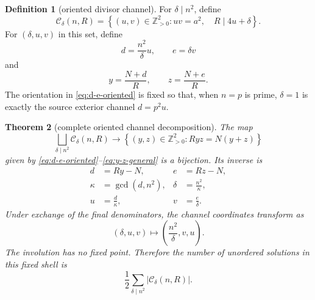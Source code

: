 \documentclass[11pt]{article}
\newtheorem{theorem}{Theorem}[section]
\theoremstyle{definition}
\newtheorem{definition}[theorem]{Definition}
\theoremstyle{remark}
\newcommand{\Z}{\mathbb Z}
\newcommand{\1}{\mathbf 1}
\begin{document}
\begin{definition}[oriented divisor channel]\label{def:channel}
For $\delta\mid n^2$, define
\begin{equation}\label{eq:channel-set}
 \mathscr C_\delta(n,R)=
 \left\{(u,v)\in\Z_{>0}^2:
 uv=a^2,\quad R\mid4u+\delta\right\}.
\end{equation}
For $(\delta,u,v)$ in this set, define
\begin{equation}\label{eq:d-e-oriented}
 d=\frac{n^2}{\delta}u,\qquad e=\delta v
\end{equation}
and
\begin{equation}\label{eq:y-z-general}
 y=\frac{N+d}{R},\qquad z=\frac{N+e}{R}.
\end{equation}
The orientation in \eqref{eq:d-e-oriented} is fixed so that, when $n=p$ is
prime, $\delta=1$ is exactly the source exterior channel
$d=p^2u$.
\end{definition}

\begin{theorem}[complete oriented channel decomposition]\label{thm:complete-channel}
The map
\begin{equation}\label{eq:channel-map}
 \bigsqcup_{\delta\mid n^2}\mathscr C_\delta(n,R)
 \longrightarrow
 \left\{(y,z)\in\Z_{>0}^2:Ryz=N(y+z)\right\}
\end{equation}
given by \eqref{eq:d-e-oriented}--\eqref{eq:y-z-general} is a bijection.
Its inverse is
\begin{align}
 d&=Ry-N,&e&=Rz-N,\label{eq:inverse-de}\\
 \kappa&=\gcd(d,n^2),&
 \delta&=\frac{n^2}{\kappa},\label{eq:inverse-delta}\\
 u&=\frac d\kappa,&v&=\frac e\delta.\label{eq:inverse-uv}
\end{align}
Under exchange of the final denominators, the channel coordinates transform
as
\begin{equation}\label{eq:complement-involution}
 (\delta,u,v)\longmapsto
 \left(\frac{n^2}{\delta},v,u\right).
\end{equation}
The involution has no fixed point.  Therefore the number of unordered
solutions in this fixed shell is
\begin{equation}\label{eq:unordered-half}
 \frac12\sum_{\delta\mid n^2}|\mathscr C_\delta(n,R)|.
\end{equation}
\end{theorem}
\end{document}
